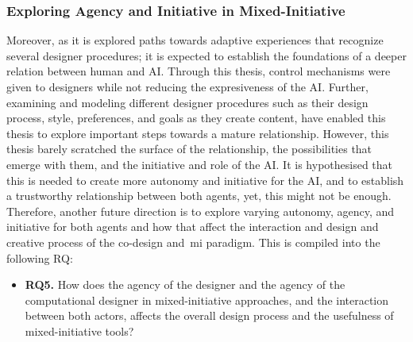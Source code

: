 
\subsubsection{Exploring Agency and Initiative in Mixed-Initiative}

Moreover, as it is explored paths towards adaptive experiences that recognize several designer procedures; it is expected to establish the foundations of a deeper relation between human and AI. Through this thesis, control mechanisms were given to designers while not reducing the expresiveness of the AI. Further, examining and modeling different designer procedures such as their design process, style, preferences, and goals as they create content, have enabled this thesis to explore important steps towards a mature relationship. However, this thesis barely scratched the surface of the relationship, the possibilities that emerge with them, and the initiative and role of the AI. It is hypothesised that this is needed to create more autonomy and initiative for the AI, and to establish a trustworthy relationship between both agents, yet, this might not be enough. Therefore, another future direction is to explore varying autonomy, agency, and initiative for both agents and how that affect the interaction and design and creative process of the co-design and~\acrshort{mi} paradigm. This is compiled into the following RQ:



\begin{itemize}
    \item[] \textbf{RQ5.} How does the agency of the designer and the agency of the computational designer in mixed-initiative approaches, and the interaction between both actors, affects the overall design process and the usefulness of mixed-initiative tools?
\end{itemize}




